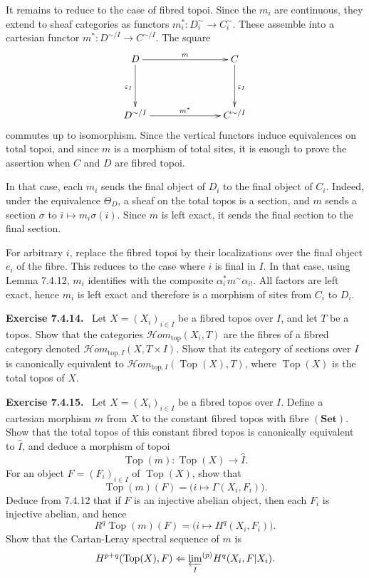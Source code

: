 \documentclass[11pt]{article}
\newcommand{\Ens}{\mathbf{Set}}
\newcommand{\Top}{\operatorname{Top}}
\newcommand{\Hhomtop}{\mathcal{H}om_{\mathrm{top}}}
\newenvironment{remarktext}[1]{\par\medskip\noindent\textbf{#1.}\ }{\par\medskip}
\begin{document}
It remains to reduce to the case of fibred topoi. Since the \(m_i\) are continuous, they extend to sheaf categories as functors \(m_i^*:D_i^{\sim}\to C_i^{\sim}\). These assemble into a cartesian functor \(m^*:D^{\sim/I}\to C^{\sim/I}\). The square
\[
\xymatrix@C=2.5cm@R=1.5cm{
D\ar[r]^m\ar[d]_{\varepsilon_I}&C\ar[d]^{\varepsilon_I}\\
D^{\sim/I}\ar[r]^{m^*}&C^{\sim/I}
}
\]
commutes up to isomorphism. Since the vertical functors induce equivalences on total topoi, and since \(m\) is a morphism of total sites, it is enough to prove the assertion when \(C\) and \(D\) are fibred topoi.

In that case, each \(m_i\) sends the final object of \(D_i\) to the final object of \(C_i\). Indeed, under the equivalence \(\Theta_D\), a sheaf on the total topos is a section, and \(m\) sends a section \(\sigma\) to \(i\mapsto m_i\sigma(i)\). Since \(m\) is left exact, it sends the final section to the final section.

For arbitrary \(i\), replace the fibred topoi by their localizations over the final object \(e_i\) of the fibre. This reduces to the case where \(i\) is final in \(I\). In that case, using Lemma 7.4.12, \(m_i\) identifies with the composite \(\alpha_i^*m^{\sim}\alpha_{i!}\). All factors are left exact, hence \(m_i\) is left exact and therefore is a morphism of sites from \(C_i\) to \(D_i\).

\begin{remarktext}{Exercise 7.4.14}
Let \(X=(X_i)_{i\in I}\) be a fibred topos over \(I\), and let \(T\) be a topos. Show that the categories \(\Hhomtop(X_i,T)\) are the fibres of a fibred category denoted \(\mathcal{H}om_{\mathrm{top},I}(X,T\times I)\). Show that its category of sections over \(I\) is canonically equivalent to \(\mathcal{H}om_{\mathrm{top},I}(\Top(X),T)\), where \(\Top(X)\) is the total topos of \(X\).
\end{remarktext}

\begin{remarktext}{Exercise 7.4.15}
Let \(X=(X_i)_{i\in I}\) be a fibred topos over \(I\). Define a cartesian morphism \(m\) from \(X\) to the constant fibred topos with fibre \((\Ens)\). Show that the total topos of this constant fibred topos is canonically equivalent to \(\widehat I\), and deduce a morphism of topoi
\[
 \Top(m):\Top(X)\to\widehat I.
\]
For an object \(F=(F_i)_{i\in I}\) of \(\Top(X)\), show that
\[
 \Top(m)(F)=\bigl(i\mapsto\Gamma(X_i,F_i)\bigr).
\]
Deduce from 7.4.12 that if \(F\) is an injective abelian object, then each \(F_i\) is injective abelian, and hence
\[
 R^q\Top(m)(F)=\bigl(i\mapsto H^q(X_i,F_i)\bigr).
\]
Show that the Cartan-Leray spectral sequence of \(m\) is
\[
 H^{p+q}(\Top(X),F)\Leftarrow {\varprojlim_I}^{(p)}H^q(X_i,F|X_i).
\]
\end{remarktext}
\end{document}
